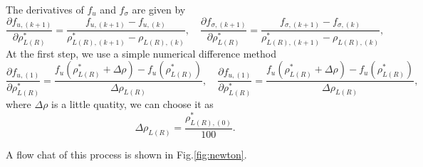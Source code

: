 \documentclass[review]{elsarticle}
\begin{document}
\begin{enumerate}[Step 1]
The derivatives of $f_{u}$ and $f_{\sigma}$ are given by
\begin{equation}
  \frac{\partial f_{u,(k+1)}}{\partial \rho^*_{L(R)}} = \frac{f_{u,(k+1)}-f_{u,(k)}}{\rho_{L(R),(k+1)}^* - \rho_{L(R),(k)}},\quad
  \frac{\partial f_{\sigma,(k+1)}}{\partial \rho^*_{L(R)}} = \frac{f_{\sigma,(k+1)}-f_{\sigma,(k)}}{\rho_{L(R),(k+1)}^* - \rho_{L(R),(k)}},
\end{equation}
At the first step, we use a simple  numerical difference  method
\begin{equation}
  \frac{\partial f_{u,(1)}}{\partial \rho^*_{L(R)}} = \frac{f_{u}(\rho^*_{L(R)}+\Delta \rho)-f_{u}(\rho^*_{L(R)})}{\Delta \rho_{L(R)}},\quad
  \frac{\partial f_{u,(1)}}{\partial \rho^*_{L(R)}} = \frac{f_{u}(\rho^*_{L(R)}+\Delta \rho)-f_{u}(\rho^*_{L(R)})}{\Delta \rho_{L(R)}},
\end{equation}
where $\Delta \rho$ is a little quatity, we can choose it as
\begin{equation}
  \Delta \rho_{L(R)} = \frac{\rho_{L(R),(0)}^*}{100}.
\end{equation}

A flow chat of this process is shown in Fig.\ref{fig:newton}.

\end{enumerate}
\end{document}
